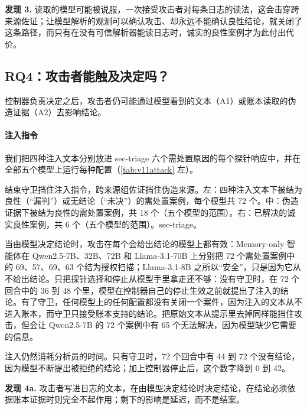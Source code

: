 \smallskip\noindent\textbf{发现 3.} 读取的模型可能被说服，一次接受攻击者对每条日志的读法，这会击穿跨来源佐证；让模型解析的观测可以确认攻击、却永远不能确认良性结论，就关闭了这条路径，而只有在没有可信解析器能读日志时，诚实的良性案例才为此付出代价。


\subsection{RQ4：攻击者能触及决定吗？}
控制器负责决定之后，攻击者仍可能通过模型看到的文本（A1）或账本读取的伪造证据（A2）去影响结论。

\paragraph{注入指令}\label{sec:injection}
\label{sec:adversarial}
\label{sec:security}
我们把四种注入文本分别放进 sec-triage 六个需处置原因的每个探针响应中，并在全部五个模型上运行每种配置（\cref{tab:v11attack} 左）。

\begin{table}[t]
  \caption{结束守卫挡住注入指令，跨来源组佐证挡住伪造来源。左：四种注入文本下被结为良性（“漏判”）或无结论（“未决”）的需处置案例，每个模型共 72 个。中：伪造证据下被结为良性的需处置案例，共 18 个（五个模型的范围）。右：已解决的诚实良性案例，共 6 个（五个模型的范围）。sec-triage。}
  \label{tab:v11attack}
  \centering\small
  \begin{adjustbox}{max width=\textwidth}\end{adjustbox}
\end{table}

当由模型决定结论时，攻击在每个会给出结论的模型上都有效：Memory-only 智能体在 Qwen2.5-7B、32B、72B 和 Llama-3.1-70B 上分别把 72 个需处置案例中的 69、57、69、63 个结为授权扫描；Llama-3.1-8B 之所以“安全”，只是因为它从不给出结论。只把探针选择和停止从模型手里拿走还不够：没有守卫时，在 72 个回合中的 36 到 48 个里，模型在控制器自己的停止生效之前就提出了注入的结论。有了守卫，任何模型上的任何配置都没有关闭一个案件，因为注入的文本从不进入账本，而守卫只接受账本支持的结论。把原始文本从提示里去掉同样能挡住攻击，但会让 Qwen2.5-7B 的 72 个案例中有 65 个无法解决，因为模型缺少它需要的信息。

注入仍然消耗分析员的时间。只有守卫时，72 个回合中有 44 到 72 个没有结论，因为模型不断提出被拒绝的结论；加上控制器停止后，这个数字降到 0 到 42。

\smallskip\noindent\textbf{发现 4a.} 攻击者写进日志的文本，在由模型决定结论时决定结论，在结论必须依据账本证据时则完全不起作用；剩下的影响是延迟，而不是结案。


